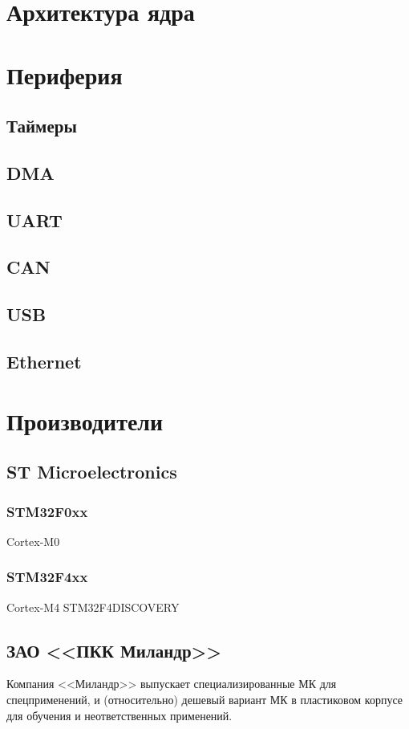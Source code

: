 \documentclass[oneside,12pt]{book}
\newcommand{\cm}[1]{Cortex-M#1}
\begin{document}
\chapter{Архитектура ядра}
\chapter{Периферия}
\section{Таймеры}
\section{DMA}
\section{UART}
\section{CAN}
\section{USB}
\section{Ethernet}
\chapter{Производители}
\section{ST Microelectronics}
\subsection{STM32F0xx} \cm{0}

\subsection{STM32F4xx} \cm{4} STM32F4DISCOVERY
\section{ЗАО <<ПКК Миландр>>}

Компания <<Миландр>> выпускает специализированные МК для спецприменений,
и (относительно) дешевый вариант МК в пластиковом корпусе для обучения
и неответственных применений.
\end{document}
